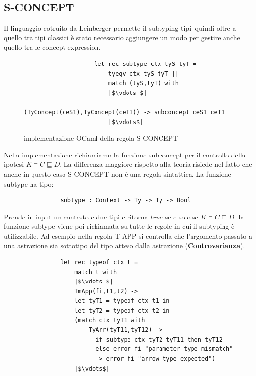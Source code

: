             \subsection{S-CONCEPT}
            Il linguaggio cotruito da Leinberger permette il subtyping tipi, quindi oltre a quello tra tipi classici è stato necessario aggiungere un modo per gestire
            anche quello tra le concept expression.
            \begin{figure}[h]
                \begin{verbatim}
                    let rec subtype ctx tyS tyT =
                        tyeqv ctx tyS tyT ||
                        match (tyS,tyT) with
                        |$\vdots $|
                            (TyConcept(ceS1),TyConcept(ceT1)) -> subconcept ceS1 ceT1
                        |$\vdots$|
                \end{verbatim}
            \caption{implementazione OCaml della regola S-CONCEPT}
            \end{figure}
            Nella implementazione richiamiamo la funzione subconcept per il controllo della ipotesi $K \vDash C \sqsubseteq D$. La differenza maggiore rispetto alla teoria
            risiede nel fatto che anche in questo caso S-CONCEPT non è una regola sintattica. La funzione subtype ha tipo:
            \begin{verbatim}
                subtype : Context -> Ty -> Ty -> Bool
            \end{verbatim}
            Prende in input un contesto e due tipi e ritorna $true$ se e solo se $K \vDash C \sqsubseteq D$. la funzione subtype viene poi richiamata su tutte le regole
            in cui il subtyping è utilizzabile. Ad esempio nella regola T-APP si controlla che l'argomento passato a una astrazione sia sottotipo del tipo atteso dalla astrazione (\textbf{Controvarianza}).
            \begin{verbatim}
                let rec typeof ctx t =
                    match t with
                    |$\vdots $|
                    TmApp(fi,t1,t2) ->
                    let tyT1 = typeof ctx t1 in
                    let tyT2 = typeof ctx t2 in
                    (match ctx tyT1 with
                        TyArr(tyT11,tyT12) ->
                          if subtype ctx tyT2 tyT11 then tyT12
                          else error fi "parameter type mismatch"
                        _ -> error fi "arrow type expected")
                    |$\vdots$|
            \end{verbatim}












        
        